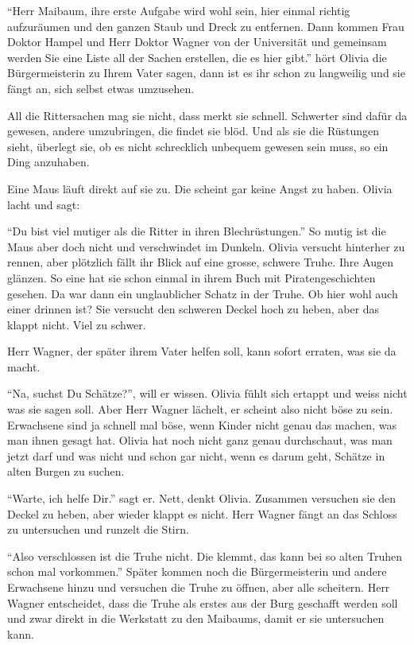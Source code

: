 \enquote{Herr Maibaum, ihre erste Aufgabe wird wohl sein, hier einmal richtig aufzuräumen und den ganzen Staub und Dreck zu entfernen. Dann kommen Frau Doktor Hampel und Herr Doktor Wagner von der Universität und gemeinsam werden Sie eine Liste all der Sachen erstellen, die es hier gibt.} hört Olivia die Bürgermeisterin zu Ihrem Vater sagen, dann ist es ihr schon zu langweilig und sie fängt an, sich selbst etwas umzusehen.

All die Rittersachen mag sie nicht, dass merkt sie schnell. Schwerter sind dafür da gewesen, andere umzubringen, die findet sie blöd. Und als sie die Rüstungen sieht, überlegt sie, ob es nicht schrecklich unbequem gewesen sein muss, so ein Ding anzuhaben. 

Eine Maus läuft direkt auf sie zu. Die scheint gar keine Angst zu haben. Olivia lacht und sagt:

\enquote{Du bist viel mutiger als die Ritter in ihren Blechrüstungen.} So mutig ist die Maus aber doch nicht und verschwindet im Dunkeln. Olivia versucht hinterher zu rennen, aber plötzlich fällt ihr Blick auf eine grosse, schwere Truhe. Ihre Augen glänzen. So eine hat sie schon einmal in ihrem Buch mit Piratengeschichten gesehen. Da war dann ein unglaublicher Schatz in der Truhe. Ob hier wohl auch einer drinnen ist? Sie versucht den schweren Deckel hoch zu heben, aber das klappt nicht. Viel zu schwer. 

Herr Wagner, der später ihrem Vater helfen soll, kann sofort erraten, was sie da macht. 

\enquote{Na, suchst Du Schätze?}, will er wissen. Olivia fühlt sich ertappt und weiss nicht was sie sagen soll. Aber Herr Wagner lächelt, er scheint also nicht böse zu sein. Erwachsene sind ja schnell mal böse, wenn Kinder nicht genau das machen, was man ihnen gesagt hat. Olivia hat noch nicht ganz genau durchschaut, was man jetzt darf und was nicht und schon gar nicht, wenn es darum geht, Schätze in alten Burgen zu suchen.

\enquote{Warte, ich helfe Dir.} sagt er. Nett, denkt Olivia. Zusammen versuchen sie den Deckel zu heben, aber wieder klappt es nicht. Herr Wagner fängt an das Schloss zu untersuchen und runzelt die Stirn.

\enquote{Also verschlossen ist die Truhe nicht. Die klemmt, das kann bei so alten Truhen schon mal vorkommen.} Später kommen noch die Bürgermeisterin und andere Erwachsene hinzu und versuchen die Truhe zu öffnen, aber alle scheitern. Herr Wagner entscheidet, dass die Truhe als erstes aus der Burg geschafft werden soll und zwar direkt in die Werkstatt zu den Maibaums, damit er sie untersuchen kann.

